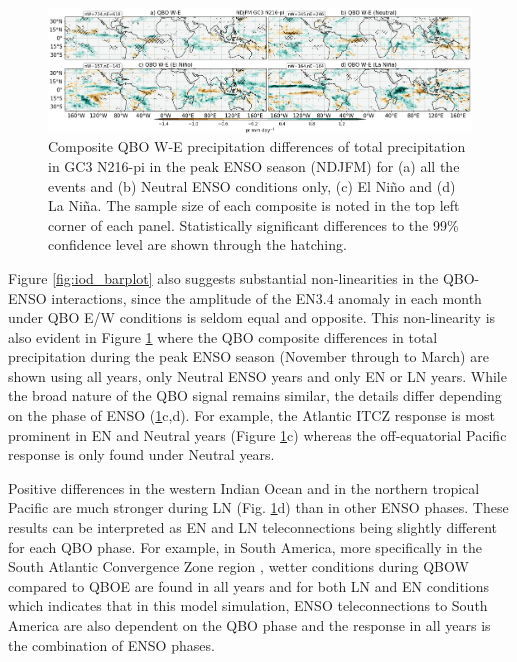   \begin{figure}[t!]
\centering
 \includegraphics[width=\linewidth]{figures/ensoqboprwinter.png}
\caption[Precipitation response to QBO W-E for GC3 N216-pi under different QBO phases.]{  Composite QBO W-E precipitation differences of total precipitation in GC3 N216-pi in the peak ENSO season (NDJFM) for (a) all the events and (b) Neutral ENSO conditions only, (c) El Niño and (d) La Niña. The sample size of each composite is noted in the top left corner of each panel. Statistically significant differences to the 99\% confidence level are shown through the hatching. }
\label{fig:qboenso}
\end{figure}

Figure \ref{fig:iod_barplot} also suggests substantial non-linearities in the QBO-ENSO interactions, since the amplitude of the EN3.4 anomaly in each month under QBO E/W conditions is seldom equal and opposite. This non-linearity is also evident in Figure \ref{fig:qboenso} where the QBO composite differences in total precipitation during the peak ENSO season (November through to March) are shown using all years, only Neutral ENSO years and only EN or LN years. While the broad nature of the QBO signal remains similar, the details differ depending on the phase of ENSO (\ref{fig:qboenso}c,d). For example, the Atlantic ITCZ response is most prominent in EN and Neutral years (Figure \ref{fig:qboenso}c) whereas the off-equatorial Pacific response is only found under Neutral years. %

Positive differences in the western Indian Ocean and in the northern tropical Pacific are much stronger during LN (Fig. \ref{fig:qboenso}d) than in other ENSO phases. These results can be interpreted as EN and LN teleconnections being slightly different for each QBO phase. For example, in South America, more specifically in the South Atlantic Convergence Zone region \citep{jorgetti2014}, wetter conditions during QBOW compared to QBOE are found in all years and for both LN and EN conditions which indicates that in this model simulation, ENSO teleconnections to South America are also dependent on the QBO phase and the response in all years is the combination of ENSO phases.%

